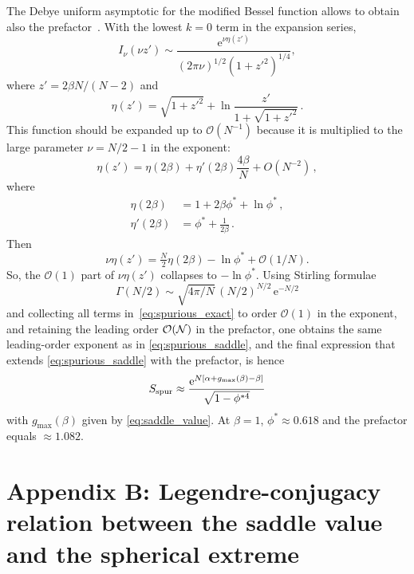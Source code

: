 \documentclass[letterpaper]{article} %
\newcommand{\e}{{\mathrm{e}}}
\newcommand{\Bnet}{\beta}
\begin{document}
The Debye uniform asymptotic for the modified Bessel function allows to obtain 
also the prefactor~\citep[10.41.3]{olver2010nist}. With the lowest $k = 0$ term in the expansion series,
\begin{equation}
I_\nu(\nu z') \sim \frac{\e^{\nu\eta(z')}}{(2\pi\nu)^{1/2}(1+{z'}^2)^{1/4}},
\end{equation}
where $z' = 2\Bnet N/(N-2)$ and
\begin{equation}
    \eta(z') = \sqrt{1+{z'}^2} + \ln\frac{z'}{1+\sqrt{1+{z'}^2}}\,.
    \label{eq:bessel_debye}
\end{equation}  
This function should be expanded up to $\mathcal{O}(N^{-1})$ because it is multiplied 
to the large parameter $\nu = N/2 - 1$ in the exponent:
\begin{equation}
    \eta(z') = \eta(2\Bnet) + \eta'(2\Bnet) \frac{4\Bnet}{N} + O(N^{-2})\,,
\end{equation}
where
\begin{align}
    \eta(2\Bnet)  &= 1 + 2\Bnet\phi^* + \ln\phi^*\,, \\
    \eta'(2\Bnet) &= \phi^* + \frac{1}{2\Bnet}\,.
\end{align}
Then 
\begin{equation}
    \nu \eta(z') = \tfrac{N}{2} \eta(2\Bnet) - \ln\phi^* + \mathcal{O}(1/N).
\end{equation}
So, the $\mathcal{O}(1)$ part of $\nu\eta(z')$ collapses to $-\ln\phi^*$. Using Stirling formulae
\begin{equation}
    \Gamma(N/2) \sim \sqrt{4\pi/N}\,(N/2)^{N/2}\,\e^{-N/2}
\end{equation} 
and collecting all terms in~\eqref{eq:spurious_exact} to order $\mathcal{O}(1)$ in the exponent, and retaining 
the leading order $\cal O(N)$ in the prefactor, one obtains the same leading-order exponent as 
in \eqref{eq:spurious_saddle}, and the final expression that extends \eqref{eq:spurious_saddle} with the prefactor, is hence
\begin{equation}
S_{\rm spur} \approx \frac{\e^{N[\alpha + g_{\max}(\Bnet) - \Bnet]}}{\sqrt{1-\phi^{*4}}}
\label{eq:spurious_laplace}
\end{equation}
with $g_{\max}(\Bnet)$ given by \eqref{eq:saddle_value}.
At $\Bnet = 1$, $\phi^* \approx 0.618$ and the prefactor equals $\approx 1.082$.


\section{Appendix B: Legendre-conjugacy relation between the saddle value and the spherical extreme}
\end{document}
